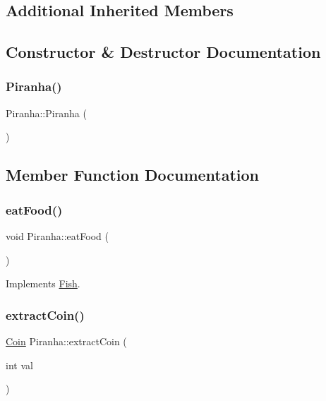 \subsection*{Additional Inherited Members}


\subsection{Constructor \& Destructor Documentation}
\mbox{\label{class_piranha_a7e3a4c5c7f458c16717c8cb997fc0331}} 
\subsubsection{\texorpdfstring{Piranha()}{Piranha()}}
{\footnotesize\ttfamily Piranha\+::\+Piranha (\begin{DoxyParamCaption}{ }\end{DoxyParamCaption})}



\subsection{Member Function Documentation}
\mbox{\label{class_piranha_a50992b83e072f8719150d302469a462f}} 
\subsubsection{\texorpdfstring{eat\+Food()}{eatFood()}}
{\footnotesize\ttfamily void Piranha\+::eat\+Food (\begin{DoxyParamCaption}{ }\end{DoxyParamCaption})\hspace{0.3cm}{\ttfamily [virtual]}}



Implements \mbox{\hyperlink{class_fish_aad629fb35c786b2a44c1204d011f9ae4}{Fish}}.

\mbox{\label{class_piranha_aed1eb8799f7b92fbfb47fd760bf31cbf}} 
\subsubsection{\texorpdfstring{extract\+Coin()}{extractCoin()}}
{\footnotesize\ttfamily \mbox{\hyperlink{class_coin}{Coin}} Piranha\+::extract\+Coin (\begin{DoxyParamCaption}\item[{int}]{val }\end{DoxyParamCaption})}


